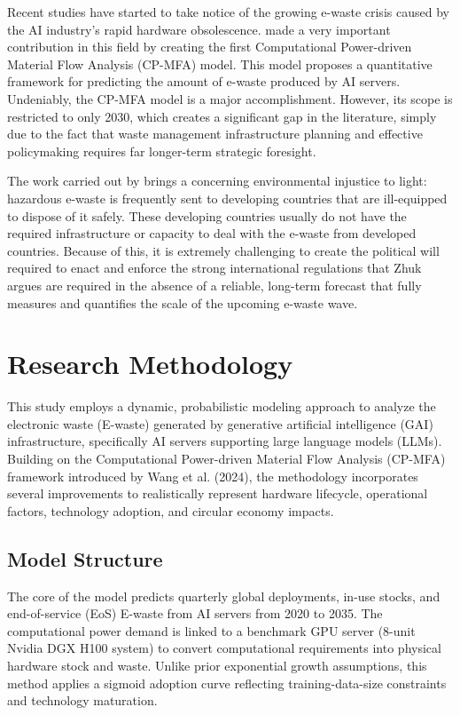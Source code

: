 \documentclass[a4paper, 12pt]{article}
\begin{document}
Recent studies have started to take notice of the growing e-waste crisis caused by the AI industry's rapid hardware obsolescence. \citet{wang_2024_ewaste} made a very important contribution in this field by creating the first Computational Power-driven Material Flow Analysis (CP-MFA) model.  This model proposes a quantitative framework for predicting the amount of e-waste produced by AI servers. Undeniably, the CP-MFA model is a major accomplishment. However, its scope is restricted to only 2030, which creates a significant gap in the literature, simply due to the fact that waste management infrastructure planning and effective policymaking requires far longer-term strategic foresight. 

The work carried out by \citet{Zhuk2023} brings a concerning environmental injustice to light: hazardous e-waste is frequently sent to developing countries that are ill-equipped to dispose of it safely. These developing countries usually do not have the required infrastructure or capacity to deal with the e-waste from developed countries. Because of this, it is extremely challenging to create the political will required to enact and enforce the strong international regulations that Zhuk argues are required in the absence of a reliable, long-term forecast that fully measures and quantifies the scale of the upcoming e-waste wave.  

\section{Research Methodology}
This study employs a dynamic, probabilistic modeling approach to analyze the electronic waste (E-waste) generated by generative artificial intelligence (GAI) infrastructure, specifically AI servers supporting large language models (LLMs). Building on the Computational Power-driven Material Flow Analysis (CP-MFA) framework introduced by Wang et al. (2024), the methodology incorporates several improvements to realistically represent hardware lifecycle, operational factors, technology adoption, and circular economy impacts.

\subsection{Model Structure}
The core of the model predicts quarterly global deployments, in-use stocks, and end-of-service (EoS) E-waste from AI servers from 2020 to 2035. The computational power demand is linked to a benchmark GPU server (8-unit Nvidia DGX H100 system) to convert computational requirements into physical hardware stock and waste. Unlike prior exponential growth assumptions, this method applies a sigmoid adoption curve reflecting training-data-size constraints and technology maturation.
\end{document}
